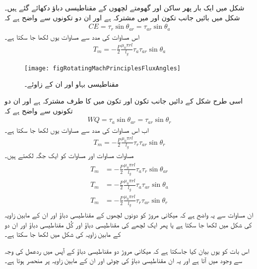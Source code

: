شکل   میں ایک بار پھر ساکن اور گھومتے لچھوں کے مقناطیسی دباؤ دکھائے گئے ہیں۔ شکل میں بائیں جانب تکون  اور  میں  مشترکہ ہے اور ان دو تکونوں سے واضح ہے کہ
\begin{align}
CE=\tau_r \sin \theta_{ar}=\tau_{ar} \sin \theta_a
\end{align}
اس مساوات کی مدد سے مساوات  یوں لکھا جا سکتا ہے۔
\begin{align}
T_m=-\frac{P}{2}\frac{\mu_0 \pi r l}{l_g} \tau_a \tau_{ar}  \sin \theta_a
\end{align}
%
\begin{figure}
\centering
\texttt{[image: figRotatingMachPrinciplesFluxAngles]}
\caption{مقناطیسی بہاو اور ان کے زاوئے۔}
\label{شکل_گھومتے_مشین_بہاو_کے_زاوئے}
\end{figure}
اسی طرح شکل   کے دائیں جانب تکون  اور تکون  میں  کا طرف مشترکہ ہے اور ان دو تکونوں سے واضح ہے کہ
\begin{align}
WQ=\tau_a \sin \theta_{ar}=\tau_{ar} \sin \theta_r
\end{align}
اب اس مساوات کی مدد سے مساوات  یوں لکھا جا سکتا ہے۔
\begin{align}
T_m=-\frac{P}{2}\frac{\mu_0 \pi r l}{l_g} \tau_r \tau_{ar}  \sin \theta_r
\end{align}
مساوات  مساوات  اور مساوات  کو ایک جگہ لکھتے ہیں۔
\begin{gather}
\begin{aligned}
T_m&=-\frac{P}{2}\frac{\mu_0 \pi r l}{l_g} \tau_a \tau_r \sin \theta_{ar}\\
T_m&=-\frac{P}{2}\frac{\mu_0 \pi r l}{l_g} \tau_a \tau_{ar}  \sin \theta_a\\
T_m&=-\frac{P}{2}\frac{\mu_0 \pi r l}{l_g} \tau_r \tau_{ar}  \sin \theta_r
\end{aligned}
\end{gather}
ان مساوات سے یہ واضح ہے کہ میکانی مروڑ کو دونوں لچھوں کے مقناطیسی دباؤ اور ان کے مابین زاویہ کی شکل میں لکھا جا سکتا ہے یا پھر ایک لچھے کی مقناطیسی دباؤ اور کُل مقناطیسی دباؤ اور ان دو کے مابین زاویہ کی شکل میں لکھا جا سکتا ہے۔

اس بات کو یوں بیان کیا جاسکتا ہے کہ میکانی مروڑ دو مقناطیسی دباؤ کے آپس میں ردعمل کی وجہ سے وجود میں آتا ہے اور یہ ان مقناطیسی دباؤ کی چوٹی اور ان کے مابین زاویہ پر منحصر ہوتا ہے۔

